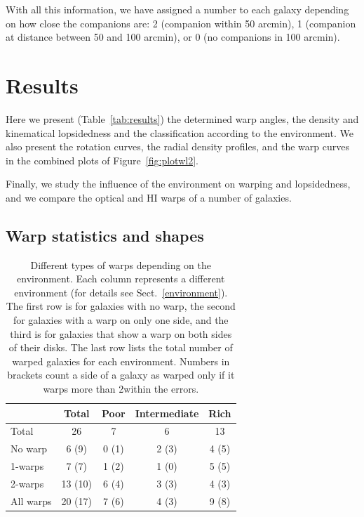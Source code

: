\documentclass{aa}
\begin{document}
With all this information, we have assigned a number to each galaxy
depending on how close the companions are: 2 (companion within 50
arcmin), 1 (companion at distance between 50 and 100 arcmin), or 0 (no
companions in 100 arcmin). 

\section{Results}

Here we present (Table~\ref{tab:results}) the determined warp angles, the density and 
kinematical lopsidedness and the classification according to the
environment. We also present the rotation curves, the radial density
profiles, and the warp curves in the combined plots of
Figure~\ref{fig:plotwl2}.  

Finally, we study the influence of the environment on warping and
lopsidedness, and we compare the optical and HI warps of a number of galaxies.

\subsection{Warp statistics and shapes}
\label{stat}

\begin{center}
\begin{table}
\begin{center}
\begin{tabular}{l|c|ccc}
\hline
          & Total   & Poor    & Intermediate & Rich  \\ 
\hline                                                                  
Total     & 26      &  7      &    6      &  13      \\
\hline                                                           
No warp   &  6 (9)  &  0 (1)  &   2 (3)   &   4 (5)  \\
1-warps   &  7 (7)  &  1 (2)  &   1 (0)   &   5 (5)  \\
2-warps   & 13 (10) &  6 (4)  &   3 (3)   &   4 (3)  \\
\hline
All warps & 20 (17) &   7 (6) &   4 (3)   &  9 (8)   \\
\hline
\end{tabular}
\caption{Different types of warps depending on the environment. Each
  column represents a different environment (for details see
  Sect.~\ref{environment}). The first row is for galaxies with no warp, the
  second for galaxies with a warp on only one side, and the third is
  for galaxies that
  show a warp on both sides of their disks. The last row lists the
  total number of warped galaxies for each environment. Numbers in
  brackets count a side of a galaxy as warped only if it warps more
  than 2\degr within the errors.}
\label{tab:warp}
\end{center}
\end{table}
\end{center}
\end{document}
